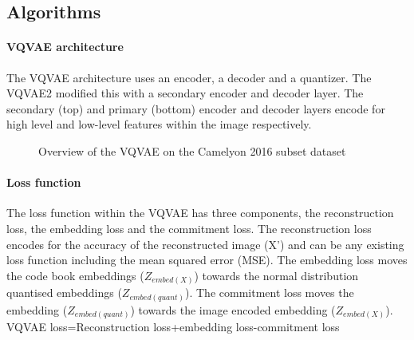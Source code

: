 \documentclass[review]{elsarticle}
\begin{document}
\subsection{Algorithms}
\paragraph{VQVAE architecture} The VQVAE architecture uses an encoder, a decoder and a quantizer. The VQVAE2 modified this with a secondary encoder and decoder layer. The secondary (top) and primary (bottom) encoder and decoder layers encode for high level and low-level features within the image respectively.


\begin{figure}
    \centering
    \caption{Overview of the VQVAE on the Camelyon 2016 subset dataset}
    \label{fig:VQVAE_camelyon_2016_overview_diagram}
\end{figure}

\paragraph{Loss function} The loss function within the VQVAE has three components, the reconstruction loss, the embedding loss and the commitment loss. The reconstruction loss encodes for the accuracy of the reconstructed image (X') and can be any existing loss function including the mean squared error (MSE). The embedding loss moves the code book embeddings ($Z_{embed(X)}$) towards the normal distribution quantised embeddings ($Z_{embed(quant)}$). The commitment loss moves the embedding ($Z_{embed(quant)}$) towards the image encoded embedding ($Z_{embed(X)}$). \\
    VQVAE loss=Reconstruction loss+embedding loss-commitment loss
    
\end{document}
